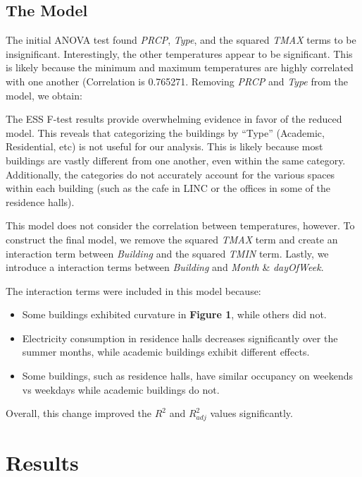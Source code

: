 \documentclass[
]{article}
\providecommand{\tightlist}{%
  \setlength{\itemsep}{0pt}\setlength{\parskip}{0pt}}
\begin{document}
\hypertarget{the-model}{%
\subsection{The Model}\label{the-model}}

The initial ANOVA test found \emph{PRCP}, \emph{Type}, and the squared
\emph{TMAX} terms to be insignificant. Interestingly, the other
temperatures appear to be significant. This is likely because the
minimum and maximum temperatures are highly correlated with one another
(Correlation is 0.765271. Removing \emph{PRCP} and \emph{Type} from the
model, we obtain:

The ESS F-test results provide overwhelming evidence in favor of the
reduced model. This reveals that categorizing the buildings by ``Type''
(Academic, Residential, etc) is not useful for our analysis. This is
likely because most buildings are vastly different from one another,
even within the same category. Additionally, the categories do not
accurately account for the various spaces within each building (such as
the cafe in LINC or the offices in some of the residence halls).

This model does not consider the correlation between temperatures,
however. To construct the final model, we remove the squared \emph{TMAX}
term and create an interaction term between \emph{Building} and the
squared \emph{TMIN} term. Lastly, we introduce a interaction terms
between \emph{Building} and \emph{Month} \& \emph{dayOfWeek}.

The interaction terms were included in this model because:

\begin{itemize}
\tightlist
\item
  Some buildings exhibited curvature in \textbf{Figure 1}, while others
  did not.
\item
  Electricity consumption in residence halls decreases significantly
  over the summer months, while academic buildings exhibit different
  effects.
\item
  Some buildings, such as residence halls, have similar occupancy on
  weekends vs weekdays while academic buildings do not.
\end{itemize}

Overall, this change improved the \(R^2\) and \(R^2_{adj}\) values
significantly.

\hypertarget{results}{%
\section{Results}\label{results}}
\end{document}
